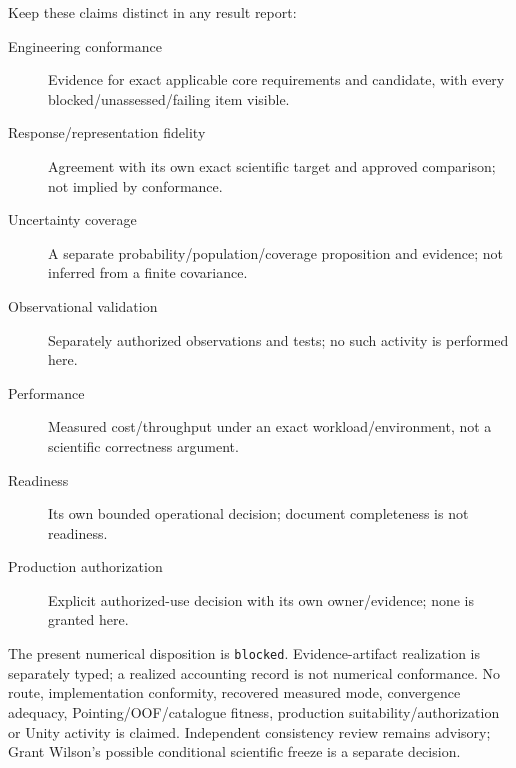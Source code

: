 {Keep these claims distinct in any result report:
\begin{description}
\item[Engineering conformance] Evidence for exact applicable core requirements and candidate, with every blocked/unassessed/failing item visible.
\item[Response/representation fidelity] Agreement with its own exact scientific target and approved comparison; not implied by conformance.
\item[Uncertainty coverage] A separate probability/population/coverage proposition and evidence; not inferred from a finite covariance.
\item[Observational validation] Separately authorized observations and tests; no such activity is performed here.
\item[Performance] Measured cost/throughput under an exact workload/environment, not a scientific correctness argument.
\item[Readiness] Its own bounded operational decision; document completeness is not readiness.
\item[Production authorization] Explicit authorized-use decision with its own owner/evidence; none is granted here.
\end{description}
The present numerical disposition is \texttt{blocked}. Evidence-artifact realization
is separately typed; a realized accounting record is not numerical conformance.
No route, implementation conformity, recovered measured mode, convergence
adequacy, Pointing/OOF/catalogue fitness, production suitability/authorization
or Unity activity is claimed. Independent consistency review remains advisory;
Grant Wilson's possible conditional scientific freeze is a separate decision.
}
